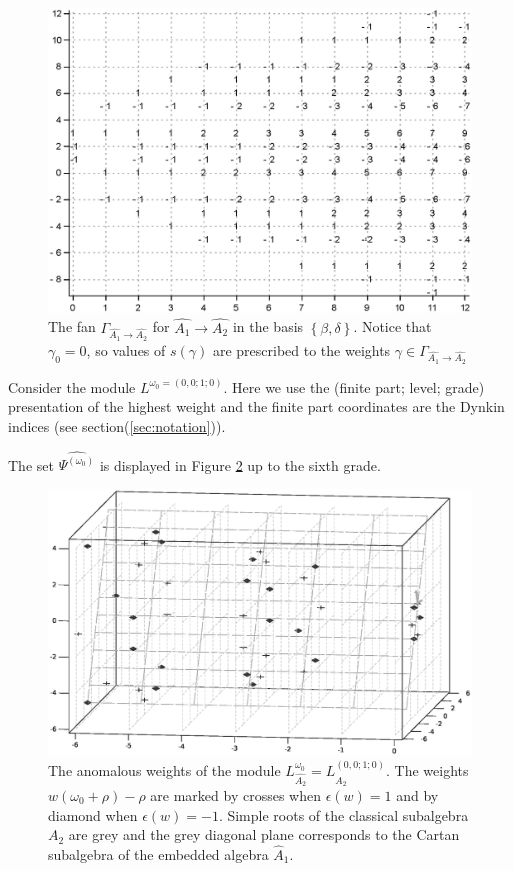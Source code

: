 \documentclass[12pt]{iopart}
\theoremstyle{definition}
\begin{document}
\begin{figure}[h!bt]
  \centering
  \includegraphics[width=125mm]{figure6.eps}

  \caption{The fan $\Gamma_{\hat{A_1}\rightarrow \hat{A_2}}$ for $\hat{A_1}\rightarrow \hat{A_2}$
  in the basis $\left\{\beta,\delta \right\}$. Notice that $\gamma_0 =0$, so values of $s(\gamma)$
  are prescribed to the weights $\gamma\in \Gamma_{\hat{A_1}\rightarrow \hat{A_2}}$}
  \label{fig:AffineA2A1Fan}
\end{figure}

Consider the module $L^{\omega_0=(0,0;1;0)}$. Here we use the (finite part; level; grade)
presentation of the highest weight and the finite part
coordinates are the Dynkin indices (see section(\ref{sec:notation})).

The set $\widehat{\Psi^{(\omega_0)}}$  is displayed in Figure
\ref{fig:affine_A2_anom_point} up to the sixth grade.

\begin{figure}[h!tb]
  \includegraphics[width=135mm]{figure7.eps}
  \caption{The anomalous weights of the module $L_{\hat{A_2}}^{\omega_0}=L^{(0,0;1;0)}_{\hat{A_2}}$.
  The weights $w (\omega_0+\rho)-\rho$ are marked by crosses when $\epsilon(w)=1$ and
by diamond when $\epsilon(w)=-1$. Simple roots of the classical subalgebra $A_2$ are
grey and the grey diagonal plane corresponds to the Cartan subalgebra of
the embedded algebra $\hat{A}_1$.}
  \label{fig:affine_A2_anom_point}
\end{figure}
\end{document}

